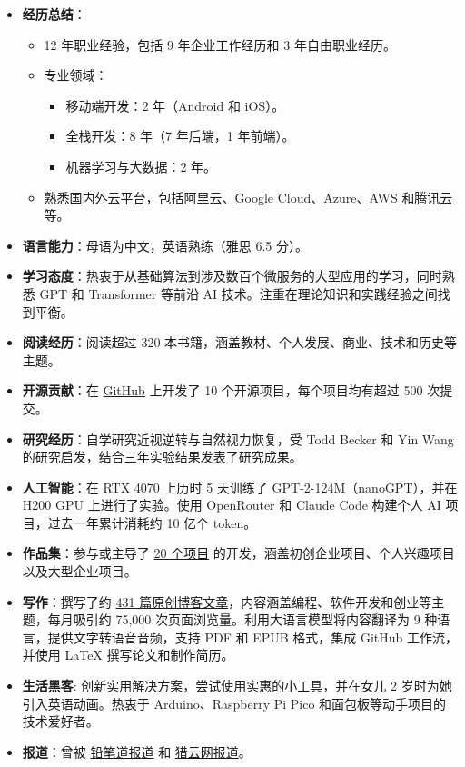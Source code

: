 \documentclass[a4paper,12pt]{article}
\begin{document}
\begin{itemize}
\begin{itemize}
        \end{itemize}
    \item \textbf{经历总结}：
        \begin{itemize}
            \item 12 年职业经验，包括 9 年企业工作经历和 3 年自由职业经历。
            \item 专业领域：
                \begin{itemize}
                    \item 移动端开发：2 年（Android 和 iOS）。
                    \item 全栈开发：8 年（7 年后端，1 年前端）。
                    \item 机器学习与大数据：2 年。
                \end{itemize}
            \item 熟悉国内外云平台，包括阿里云、\href{https://cloud.google.com}{Google Cloud}、\href{https://azure.microsoft.com}{Azure}、\href{https://aws.amazon.com}{AWS} 和腾讯云等。
        \end{itemize}
    \item \textbf{语言能力}：母语为中文，英语熟练（雅思 6.5 分）。
    \item \textbf{学习态度}：热衷于从基础算法到涉及数百个微服务的大型应用的学习，同时熟悉 GPT 和 Transformer 等前沿 AI 技术。注重在理论知识和实践经验之间找到平衡。
    \item \textbf{阅读经历}：阅读超过 320 本书籍，涵盖教材、个人发展、商业、技术和历史等主题。
    \item \textbf{开源贡献}：在 \href{https://github.com/lzwjava}{GitHub} 上开发了 10 个开源项目，每个项目均有超过 500 次提交。
    \item \textbf{研究经历}：自学研究近视逆转与自然视力恢复，受 Todd Becker 和 Yin Wang 的研究启发，结合三年实验结果发表了研究成果。
    \item \textbf{人工智能}：在 RTX 4070 上历时 5 天训练了 GPT-2-124M（nanoGPT），并在 H200 GPU 上进行了实验。使用 OpenRouter 和 Claude Code 构建个人 AI 项目，过去一年累计消耗约 10 亿个 token。
    \item \textbf{作品集}：参与或主导了 \href{https://lzwjava.com/pages/portfolio-en}{20 个项目} 的开发，涵盖初创企业项目、个人兴趣项目以及大型企业项目。
    \item \textbf{写作}：撰写了约 \href{https://lzwjava.com}{431 篇原创博客文章}，内容涵盖编程、软件开发和创业等主题，每月吸引约 75,000 次页面浏览量。利用大语言模型将内容翻译为 9 种语言，提供文字转语音音频，支持 PDF 和 EPUB 格式，集成 GitHub 工作流，并使用 LaTeX 撰写论文和制作简历。
    \item \textbf{生活黑客}: 创新实用解决方案，尝试使用实惠的小工具，并在女儿 2 岁时为她引入英语动画。热衷于 Arduino、Raspberry Pi Pico 和面包板等动手项目的技术爱好者。
    \item \textbf{报道}：曾被 \href{https://www.pencilnews.cn/p/13402.html}{铅笔道报道} 和 \href{https://lieyunpro.com/archives/290646}{猎云网报道}。
\end{itemize}
\end{document}
